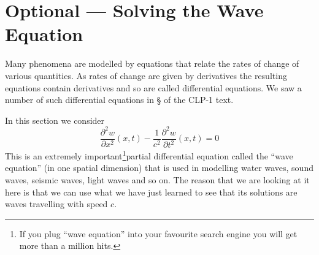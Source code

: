 \section{Optional --- Solving the Wave Equation}\label{sec wave}
Many phenomena are modelled by equations that relate the rates of
change of various quantities. As rates of change are given by derivatives
the resulting equations contain derivatives and so are called
differential equations. We saw a number of such differential equations
in \S{} of the CLP-1 text.

In this section we consider 
\begin{equation*}
\frac{\partial^2 w}{\partial x^2}(x,t)
         -\frac{1}{c^2}\frac{\partial^2 w}{\partial t^2}(x,t)=0
\end{equation*}
This is an extremely important\footnote{If you plug ``wave equation'' into your favourite search engine you will get more than a million hits.}partial differential equation called the ``wave equation'' (in one spatial dimension)
that is used in modelling water waves, sound waves, seismic waves,
light waves and so on.
The reason that we are looking at it here is that we can use what we have just
learned to see that its solutions are waves travelling with speed $c$.

